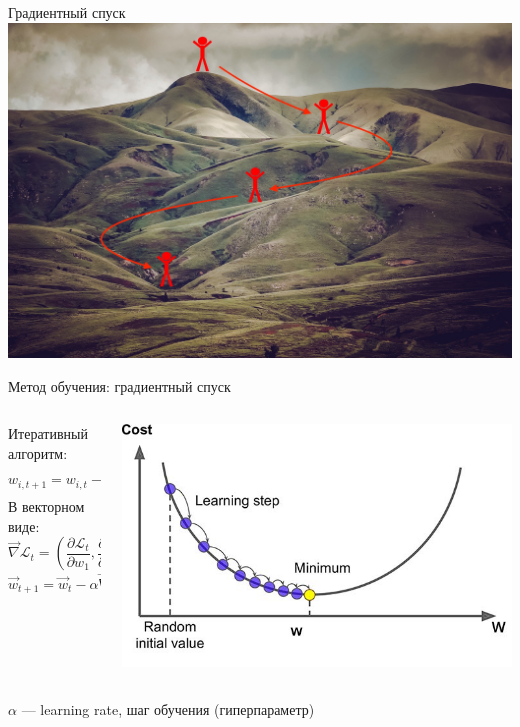 \documentclass[aspectratio=169]{beamer}
\begin{document}
\begin{frame}{Градиентный спуск}
    \centering
	\includegraphics[width=.7\linewidth]{graphs/fig4.jpg}
\end{frame}

\begin{frame}{Метод обучения: градиентный спуск}
		\begin{columns}
			\begin{column}{.35\linewidth}
                Итеративный алгоритм:
                \[ w_{i, t+1} = w_{i, t} - \alpha \frac{\partial \mathcal{L}_t}{\partial w_i} \]
                В векторном виде:
                \[
                    \vec{\nabla} \mathcal{L}_t = \left(
                    \frac{\partial \mathcal{L}_t}{\partial w_1},
                    \frac{\partial \mathcal{L}_t}{\partial w_2},
                    \cdots
                    \right)
                \]
                \[ \vec{w}_{t+1} = \vec{w}_t - \alpha \vec{\nabla} \mathcal{L}_t \]
			\end{column}
			\begin{column}{.6\linewidth}
				\centering
				\includegraphics[width=\linewidth]{graphs/fig5.jpg}
			\end{column}
		\end{columns}
	\centering
	\(\alpha\) --- learning rate, шаг обучения (гиперпараметр)
\end{frame}
\end{document}
